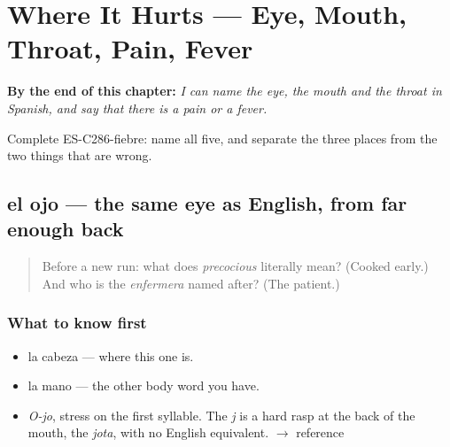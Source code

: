 
\chapter{Where It Hurts --- Eye, Mouth, Throat, Pain, Fever}
\label{ch:donde-duele}

\begin{chapteropening}
\textbf{By the end of this chapter:} \emph{I can name the eye, the mouth and the throat in Spanish, and say that there is a pain or a fever.}

Complete ES-C286-fiebre: name all five, and separate the three places from the two things that are wrong.
\end{chapteropening}

\section[el ojo]{el ojo — the same eye as English, from far enough back}

\label{lesson:ES-C286-ojo}



\begin{quote}
Before a new run: what does \emph{precocious} literally mean? (Cooked early.) And who is the \emph{enfermera} named after? (The patient.)
\end{quote}

\subsection*{What to know first}
\begin{itemize}
\raggedright
  \item la cabeza — where this one is.
  \item la mano — the other body word you have.
\end{itemize}

\begin{sounds}
\begin{itemize}
\raggedright
  \item \emph{O-jo}, stress on the first syllable. The \emph{j} is a hard rasp at the back of the mouth, the \emph{jota}, with no English equivalent. $\to$ reference
\end{itemize}
\end{sounds}

